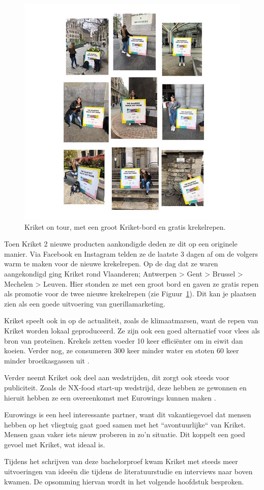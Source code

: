 \begin{figure}[h!]
	\includegraphics[width=150mm]{img/kriket-on-tour.jpg}
	\centering
	\caption{Kriket on tour, met een groot Kriket-bord en gratis krekelrepen.}
	\label{fig:kriket-on-tour}
\end{figure}

Toen Kriket 2 nieuwe producten aankondigde deden ze dit op een originele manier. Via Facebook en Instagram telden ze de laatste 3 dagen af om de volgers warm te maken voor de nieuwe krekelrepen. Op de dag dat ze waren aangekondigd ging Kriket rond Vlaanderen; Antwerpen > Gent > Brussel > Mechelen > Leuven. Hier stonden ze met een groot bord en gaven ze gratis repen als promotie voor de twee nieuwe krekelrepen (zie Figuur~\ref{fig:kriket-on-tour}). Dit kan je plaatsen zien als een goede uitvoering van guerillamarketing.

Kriket speelt ook in op de actualiteit, zoals de klimaatmarsen, want de repen van Kriket worden lokaal geproduceerd. Ze zijn ook een goed alternatief voor vlees als bron van proteïnen. Krekels zetten voeder 10 keer efficiënter om in eiwit dan koeien. Verder nog, ze consumeren 300 keer minder water en stoten 60 keer minder broeikasgassen uit \autocite{Kriket2018}.

Verder neemt Kriket ook deel aan wedstrijden, dit zorgt ook steeds voor publiciteit. Zoals de NX-food start-up wedstrijd, deze hebben ze gewonnen en hieruit hebben ze een overeenkomst met Eurowings kunnen maken \autocite{KriketEurowings2019}.

Eurowings is een heel interessante partner, want dit vakantiegevoel dat mensen hebben op het vliegtuig gaat goed samen met het ``avontuurlijke`` van Kriket. Mensen gaan vaker iets nieuw proberen in zo'n situatie. Dit koppelt een goed gevoel met Kriket, wat ideaal is.

Tijdens het schrijven van deze bachelorproef kwam Kriket met steeds meer uitvoeringen van ideeën die tijdens de literatuurstudie en interviews naar boven kwamen. De opsomming hiervan wordt in het volgende hoofdstuk besproken.
